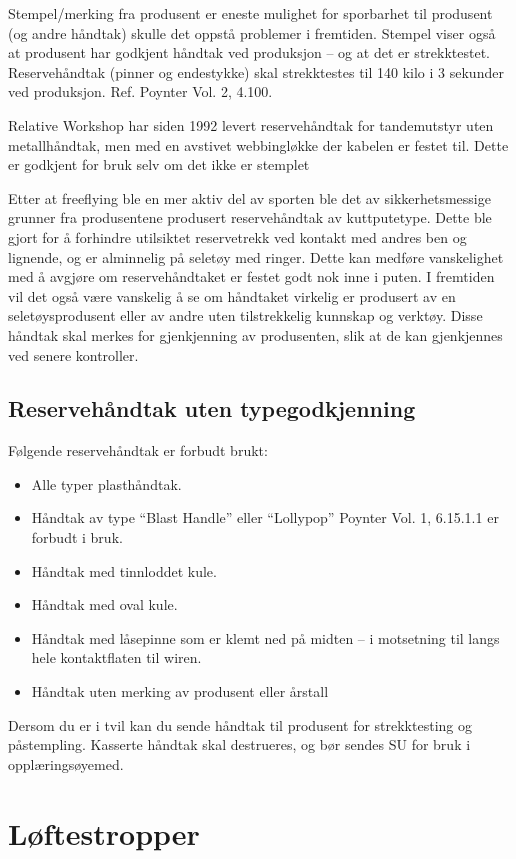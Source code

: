 Stempel/merking fra produsent er eneste mulighet for sporbarhet til produsent (og andre håndtak) skulle det oppstå problemer i fremtiden. Stempel viser også at produsent har godkjent håndtak ved produksjon – og at det er strekktestet. Reservehåndtak (pinner og endestykke) skal strekktestes til 140 kilo i 3 sekunder ved produksjon. Ref. Poynter Vol. 2, 4.100.

Relative Workshop har siden 1992 levert reservehåndtak for tandemutstyr uten metallhåndtak, men med en avstivet webbingløkke der kabelen er festet til. Dette er godkjent for bruk selv om det ikke er stemplet

Etter at freeflying ble en mer aktiv del av sporten ble det av sikkerhetsmessige grunner fra produsentene produsert reservehåndtak av kuttputetype. Dette ble gjort for å forhindre utilsiktet reservetrekk ved kontakt med andres ben og lignende, og er alminnelig på seletøy med ringer. Dette kan medføre vanskelighet med å avgjøre om reservehåndtaket er festet godt nok inne i puten. I fremtiden vil det også være vanskelig å se om håndtaket virkelig er produsert av en seletøysprodusent eller av andre uten tilstrekkelig kunnskap og verktøy. Disse håndtak skal merkes for gjenkjenning av produsenten, slik at de kan gjenkjennes ved senere kontroller.

\subsection{Reservehåndtak uten typegodkjenning}
Følgende reservehåndtak er forbudt brukt:
\begin{itemize}
\item Alle typer plasthåndtak.
\item Håndtak av type ``Blast Handle'' eller ``Lollypop'' Poynter Vol. 1, 6.15.1.1 er forbudt i bruk.
\item Håndtak med tinnloddet kule.
\item Håndtak med oval kule.
\item Håndtak med låsepinne som er klemt ned på midten – i motsetning til langs hele kontaktflaten til wiren.
\item Håndtak uten merking av produsent eller årstall
\end{itemize}

Dersom du er i tvil kan du sende håndtak til produsent for strekktesting og påstempling. Kasserte håndtak skal destrueres, og bør sendes SU for bruk i opplæringsøyemed.

\section{Løftestropper}
